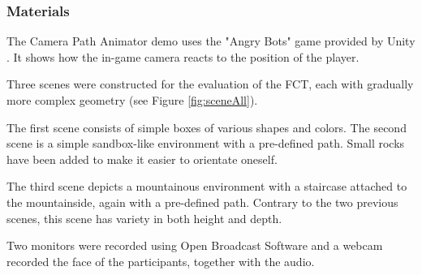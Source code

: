 \subsubsection{Materials}
The Camera Path Animator \cite{unity_camTool} demo uses the "Angry Bots" game provided by Unity \cite{angryBots}. It shows how the in-game camera reacts to the position of the player.


Three scenes were constructed for the evaluation of the FCT, each with gradually more complex geometry (see Figure \ref{fig:sceneAll}). 

The first scene consists of simple boxes of various shapes and colors.
The second scene is a simple sandbox-like environment with a pre-defined path. Small rocks have been added to make it easier to orientate oneself.


The third scene depicts a mountainous environment with a staircase attached to the mountainside, again with a pre-defined path. Contrary to the two previous scenes, this scene has variety in both height and depth.

Two monitors were recorded using Open Broadcast Software \cite{obs_cam} and a webcam recorded the face of the participants, together with the audio.



